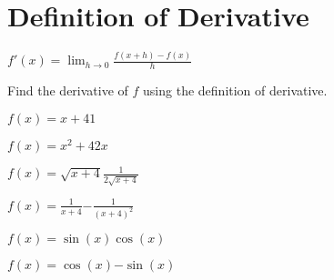 \section{Definition of Derivative}

\begin{myframe}[arc=10pt,auto outer arc]
	\centering $\displaystyle f'(x) = \lim_{h\rightarrow0} \frac{f(x+h) - f(x)}{h}$
\end{myframe}

\noindent Find the derivative of $f$ using the definition of derivative.

\problemans%
{$\displaystyle f(x) = x + 4$}{$1$}

\problemans%
{$\displaystyle f(x) = x^2 + 4$}{$2x$}

\newpage
\problemans%
{$\displaystyle f(x) = \sqrt{x + 4}$}{$\frac{1}{2\sqrt{x+4}}$}

\problemans%
{$\displaystyle f(x) = \frac{1}{x + 4}$}{$-\frac{1}{(x+4)^2}$}

\newpage
\problemans%
{$\displaystyle f(x) =\sin{(x)}$}{$\cos{(x)}$}

\problemans%
{$\displaystyle f(x) =\cos{(x)}$}{$-\sin{(x)}$}

